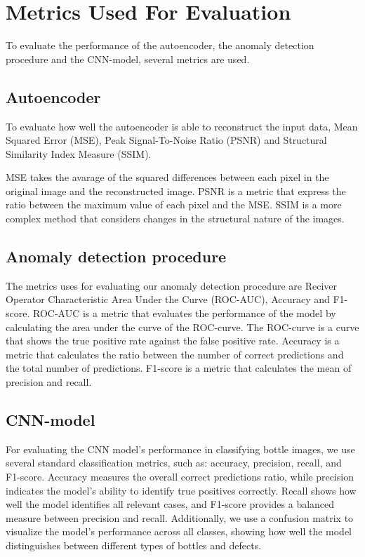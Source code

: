 \section{Metrics Used For Evaluation}

To evaluate the performance of the autoencoder, the anomaly detection procedure and the CNN-model, several metrics are used. 

\subsection{Autoencoder}

To evaluate how well the autoencoder is able to reconstruct the input data,  Mean Squared Error (MSE), Peak Signal-To-Noise Ratio (PSNR) and Structural Similarity Index Measure (SSIM).
\par
MSE takes the avarage of the squared differences between each pixel in the original image and the reconstructed image. PSNR is a metric that express the ratio between the maximum value of each pixel and the MSE. SSIM is a more complex method that considers changes in the structural nature of the images. 

\subsection{Anomaly detection procedure}

The metrics uses for evaluating our anomaly detection procedure are Reciver Operator Characteristic Area Under the Curve (ROC-AUC), Accuracy and F1-score. ROC-AUC is a metric that evaluates the performance of the model by calculating the area under the curve of the ROC-curve. The ROC-curve is a curve that shows the true positive rate against the false positive rate. Accuracy is a metric that calculates the ratio between the number of correct predictions and the total number of predictions. F1-score is a metric that calculates the mean of precision and recall.

\subsection{CNN-model}
For evaluating the CNN model's performance in classifying bottle images, we use several standard classification metrics, such as: accuracy, precision, recall, and F1-score.
Accuracy measures the overall correct predictions ratio, while precision indicates the model's ability to identify true positives correctly. 
Recall shows how well the model identifies all relevant cases, and F1-score provides a balanced measure between precision and recall. Additionally, we use a confusion matrix to visualize the model's performance across all classes, showing how well the model distinguishes between different types of bottles and defects.

